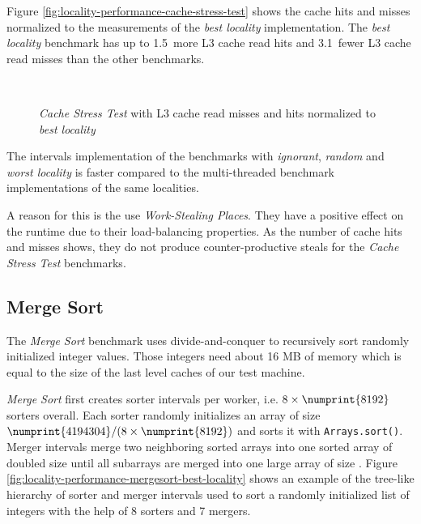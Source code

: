Figure \ref{fig:locality-performance-cache-stress-test} shows the
cache hits and misses normalized to the measurements of the \emph{best
  locality} implementation. The \emph{best locality} benchmark has up
to 1.5\texttimes\ more L3 cache read hits and 3.1\texttimes\ fewer L3
cache read misses than the other benchmarks.

\begin{figure}[!ht]
  \centering
  \\
  \caption[\emph{Cache Stress Test} L3 cache read misses and
  hits]{\emph{Cache Stress Test} with L3 cache read misses and hits
    normalized to \emph{best locality}}
  \label{fig:locality-performance-cache-stress-test-cache}
\end{figure}

The intervals implementation of the benchmarks with \emph{ignorant},
\emph{random} and \emph{worst locality} is faster compared to the
multi-threaded benchmark implementations of the same
localities. 

A reason for this is the use \emph{Work-Stealing Places}. They have a
positive effect on the runtime due to their load-balancing
properties. As the number of cache hits and misses shows, they do not
produce counter-productive steals for the \emph{Cache Stress Test}
benchmarks.

\subsection{Merge Sort}
\label{sec:locality-performance-merge-sort}

The \emph{Merge Sort} benchmark uses divide-and-conquer to recursively
sort  randomly initialized integer values. Those
integers need about 16 MB of memory which is equal to the size of the
last level caches of our test machine.

\emph{Merge Sort} first creates  sorter intervals per
worker, i.e. $8 \times \numprint{8192}$ sorters overall. Each sorter
randomly initializes an array of size $\numprint{4194304} / (8 \times
\numprint{8192})$ and sorts it with \lstinline!Arrays.sort()!. Merger
intervals merge two neighboring sorted arrays into one sorted array of
doubled size until all subarrays are merged into one large array of
size . Figure
\ref{fig:locality-performance-mergesort-best-locality} shows an
example of the tree-like hierarchy of sorter and merger intervals used
to sort a randomly initialized list of integers with the help of 8
sorters and 7 mergers.

